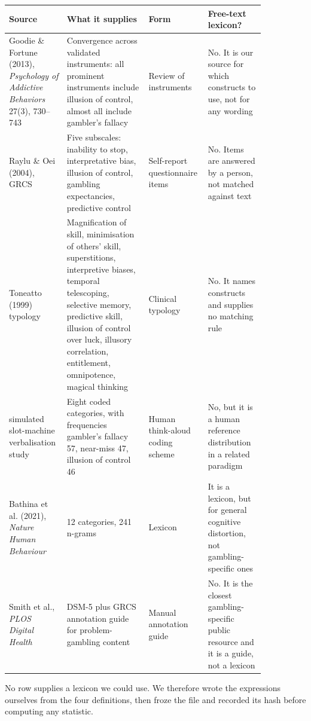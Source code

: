 \begin{center}
\footnotesize
\begin{tabular}{p{0.185\linewidth}p{0.305\linewidth}p{0.145\linewidth}p{0.215\linewidth}}
\toprule
\textbf{Source} & \textbf{What it supplies} & \textbf{Form} & \textbf{Free-text lexicon?} \\
\midrule
Goodie \& Fortune (2013), \textit{Psychology of Addictive Behaviors} 27(3), 730--743 &
Convergence across validated instruments: all prominent instruments include illusion of control,
almost all include gambler's fallacy &
Review of instruments &
No. It is our source for which constructs to use, not for any wording \\
\addlinespace
Raylu \& Oei (2004), GRCS &
Five subscales: inability to stop, interpretative bias, illusion of control, gambling
expectancies, predictive control &
Self-report questionnaire items &
No. Items are answered by a person, not matched against text \\
\addlinespace
Toneatto (1999) typology &
Magnification of skill, minimisation of others' skill, superstitions, interpretive biases,
temporal telescoping, selective memory, predictive skill, illusion of control over luck,
illusory correlation, entitlement, omnipotence, magical thinking &
Clinical typology &
No. It names constructs and supplies no matching rule \\
\addlinespace
2023 simulated slot-machine verbalisation study &
Eight coded categories, with frequencies gambler's fallacy 57, near-miss 47, illusion of
control 46 &
Human think-aloud coding scheme &
No, but it is a human reference distribution in a related paradigm \\
\addlinespace
Bathina et al. (2021), \textit{Nature Human Behaviour} &
12 categories, 241 n-grams &
Lexicon &
It is a lexicon, but for general cognitive distortion, not gambling-specific ones \\
\addlinespace
Smith et al., \textit{PLOS Digital Health} &
DSM-5 plus GRCS annotation guide for problem-gambling content &
Manual annotation guide &
No. It is the closest gambling-specific public resource and it is a guide, not a lexicon \\
\bottomrule
\end{tabular}
\end{center}

\vspace{0.4em}
\noindent
No row supplies a lexicon we could use. We therefore wrote the expressions ourselves from the four
definitions, then froze the file and recorded its hash before computing any statistic.

